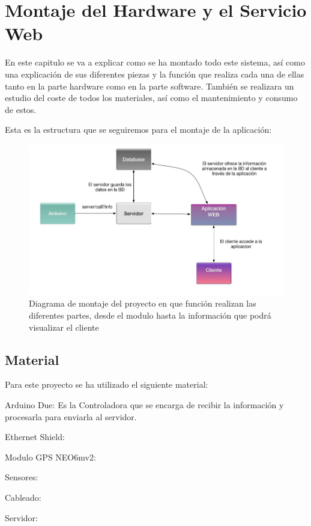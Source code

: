 
\chapter{Montaje del Hardware y el Servicio Web}

En este capitulo se va a explicar como se ha montado todo este sistema, así como una explicación de sus diferentes piezas y la función que realiza cada una de ellas tanto en la parte hardware como en la parte software.
También se realizara un estudio del coste de todos los materiales, así como el mantenimiento y consumo de estos.

Esta es la estructura que se seguiremos para el montaje de la aplicación:

\begin{figure}[!h]
	\centering
	\includegraphics[width=0.9\linewidth]{figuras/montage1}
	\caption{Diagrama de montaje del proyecto en que función realizan las diferentes partes, desde el modulo hasta la información que podrá visualizar el cliente}
	\label{fig:imgnome}
\end{figure}



\section{Material}

Para este proyecto se ha utilizado el siguiente material:

Arduino Due: Es la Controladora que se encarga de recibir la información y procesarla para enviarla al servidor.

Ethernet Shield:

Modulo GPS NEO6mv2:

Sensores:

Cableado:

Servidor:




